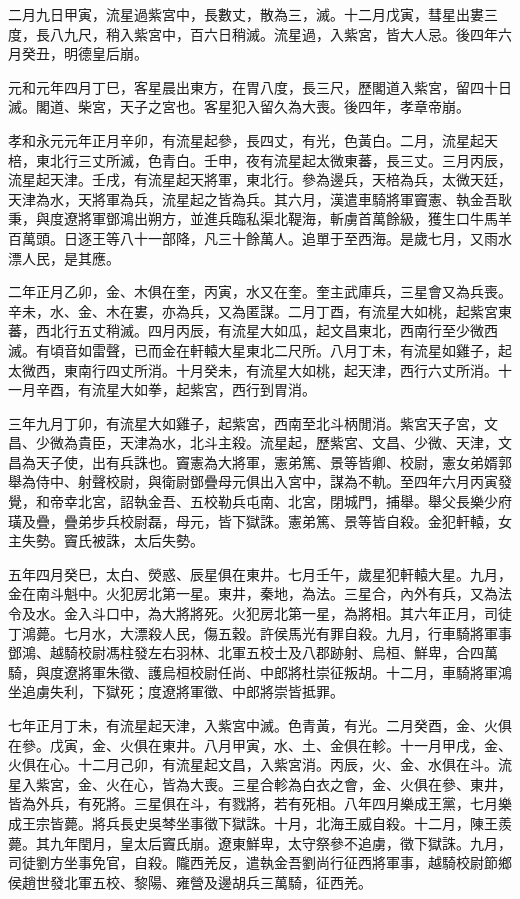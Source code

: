 \begin{pinyinscope}
二月九日甲寅，流星過紫宮中，長數丈，散為三，滅。十二月戊寅，彗星出婁三度，長八九尺，稍入紫宮中，百六日稍滅。流星過，入紫宮，皆大人忌。後四年六月癸丑，明德皇后崩。

元和元年四月丁巳，客星晨出東方，在胃八度，長三尺，歷閣道入紫宮，留四十日滅。閣道、柴宮，天子之宮也。客星犯入留久為大喪。後四年，孝章帝崩。

孝和永元元年正月辛卯，有流星起參，長四丈，有光，色黃白。二月，流星起天棓，東北行三丈所滅，色青白。壬申，夜有流星起太微東蕃，長三丈。三月丙辰，流星起天津。壬戌，有流星起天將軍，東北行。參為邊兵，天棓為兵，太微天廷，天津為水，天將軍為兵，流星起之皆為兵。其六月，漢遣車騎將軍竇憲、執金吾耿秉，與度遼將軍鄧鴻出朔方，並進兵臨私渠北鞮海，斬虜首萬餘級，獲生口牛馬羊百萬頭。日逐王等八十一部降，凡三十餘萬人。追單于至西海。是歲七月，又雨水漂人民，是其應。

二年正月乙卯，金、木俱在奎，丙寅，水又在奎。奎主武庫兵，三星會又為兵喪。辛未，水、金、木在婁，亦為兵，又為匿謀。二月丁酉，有流星大如桃，起紫宮東蕃，西北行五丈稍滅。四月丙辰，有流星大如瓜，起文昌東北，西南行至少微西滅。有頃音如雷聲，已而金在軒轅大星東北二尺所。八月丁未，有流星如雞子，起太微西，東南行四丈所消。十月癸未，有流星大如桃，起天津，西行六丈所消。十一月辛酉，有流星大如拳，起紫宮，西行到胃消。

三年九月丁卯，有流星大如雞子，起紫宮，西南至北斗柄閒消。紫宮天子宮，文昌、少微為貴臣，天津為水，北斗主殺。流星起，歷紫宮、文昌、少微、天津，文昌為天子使，出有兵誅也。竇憲為大將軍，憲弟篤、景等皆卿、校尉，憲女弟婿郭舉為侍中、射聲校尉，與衛尉鄧疊母元俱出入宮中，謀為不軌。至四年六月丙寅發覺，和帝幸北宮，詔執金吾、五校勒兵屯南、北宮，閉城門，捕舉。舉父長樂少府璜及疊，疊弟步兵校尉磊，母元，皆下獄誅。憲弟篤、景等皆自殺。金犯軒轅，女主失勢。竇氏被誅，太后失勢。

五年四月癸巳，太白、熒惑、辰星俱在東井。七月壬午，歲星犯軒轅大星。九月，金在南斗魁中。火犯房北第一星。東井，秦地，為法。三星合，內外有兵，又為法令及水。金入斗口中，為大將將死。火犯房北第一星，為將相。其六年正月，司徒丁鴻薨。七月水，大漂殺人民，傷五穀。許侯馬光有罪自殺。九月，行車騎將軍事鄧鴻、越騎校尉馮柱發左右羽林、北軍五校士及八郡跡射、烏桓、鮮卑，合四萬騎，與度遼將軍朱徵、護烏桓校尉任尚、中郎將杜崇征叛胡。十二月，車騎將軍鴻坐追虜失利，下獄死；度遼將軍徵、中郎將崇皆抵罪。

七年正月丁未，有流星起天津，入紫宮中滅。色青黃，有光。二月癸酉，金、火俱在參。戊寅，金、火俱在東井。八月甲寅，水、土、金俱在軫。十一月甲戌，金、火俱在心。十二月己卯，有流星起文昌，入紫宮消。丙辰，火、金、水俱在斗。流星入紫宮，金、火在心，皆為大喪。三星合軫為白衣之會，金、火俱在參、東井，皆為外兵，有死將。三星俱在斗，有戮將，若有死相。八年四月樂成王黨，七月樂成王宗皆薨。將兵長史吳棽坐事徵下獄誅。十月，北海王威自殺。十二月，陳王羨薨。其九年閏月，皇太后竇氏崩。遼東鮮卑，太守祭參不追虜，徵下獄誅。九月，司徒劉方坐事免官，自殺。隴西羌反，遣執金吾劉尚行征西將軍事，越騎校尉節鄉侯趙世發北軍五校、黎陽、雍營及邊胡兵三萬騎，征西羌。


\end{pinyinscope}
